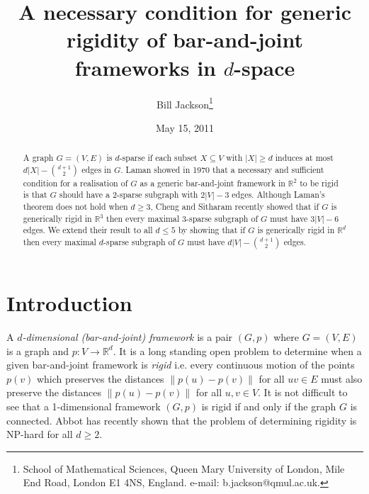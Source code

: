 \documentclass[11pt]{article}
\begin{document}
 \usepackage{./extract}
\newtheorem{theorem}{Theorem}  [section]
\newtheorem{proposition}[theorem]{Proposition}
\newtheorem{lemma}[theorem]{Lemma}
\newtheorem{claim}[theorem]{Claim}
\newtheorem{corollary}[theorem]{Corollary}
\newtheorem{fact}[theorem]{Fact}
\newtheorem{defn}[theorem]{Definition}
\newtheorem{conj}[theorem]{Conjecture}

\newcommand{\bproof}{\noindent{\bf Proof: }}
\newcommand{\eproof}{\hfill $\bullet$\\}
\newcommand{\de}{\mbox{def}}
\newcommand{\cee}{{\mathbb C}}
\newcommand{\real}{{\mathbb R}}
\newcommand{\rat}{{\mathbb Q}}
\newcommand{\zed}{{\mathbb Z}}
\newcommand{\calx}{{\cal X}}
\newcommand{\tran}{{{td}}}
\newcommand{\rank}{{\mbox{rank }}}
\newcommand{\sm}{\setminus}

\title{A necessary condition for generic rigidity of bar-and-joint frameworks in $d$-space}



\author{Bill Jackson\thanks{School of Mathematical Sciences,
 Queen Mary University of London,
Mile End Road, London E1 4NS, England. e-mail:
b.jackson@qmul.ac.uk. }
}

\date{May 15, 2011}

\maketitle

\begin{abstract}
A graph $G=(V,E)$ is {$d$-sparse} if each subset $X\subseteq V$ with
$|X|\geq d$ induces at most $d|X|-{{d+1}\choose{2}}$ edges in $G$.
Laman showed in 1970 that a necessary and sufficient condition for a
realisation of $G$ as a generic bar-and-joint framework in $\real^2$
to be rigid is that $G$ should have a 2-sparse subgraph with
$2|V|-3$ edges. Although Laman's theorem does not hold when $d\geq
3$, Cheng and Sitharam recently showed that if $G$ is generically
rigid in $\real^3$ then every maximal $3$-sparse subgraph of $G$
must have $3|V|-6$ edges. We extend their result to all $d\leq 5$ by
showing that if $G$ is generically rigid in $\real^d$ then every
maximal $d$-sparse subgraph of $G$ must have
$d|V|-{{d+1}\choose{2}}$ edges.
\end{abstract}

\section{Introduction}
A {\em $d$-dimensional (bar-and-joint) framework} is a pair $(G,p)$
where $G=(V,E)$ is a graph and $p:V\to \real^d$. It is a long
standing open problem to determine when a given bar-and-joint
framework is {\em rigid} i.e. every continuous motion of the points
$p(v)$ which preserves the distances $\|p(u)-p(v)\|$ for all $uv\in
E$ must also preserve the distances $\|p(u)-p(v)\|$ for all $u,v\in
V$. It is not difficult to see that a 1-dimensional framework
$(G,p)$ is rigid if and only if the graph $G$ is connected. Abbot
\cite{A} has recently shown that the problem of determining rigidity
is NP-hard for all $d\geq 2$.
\end{document}
